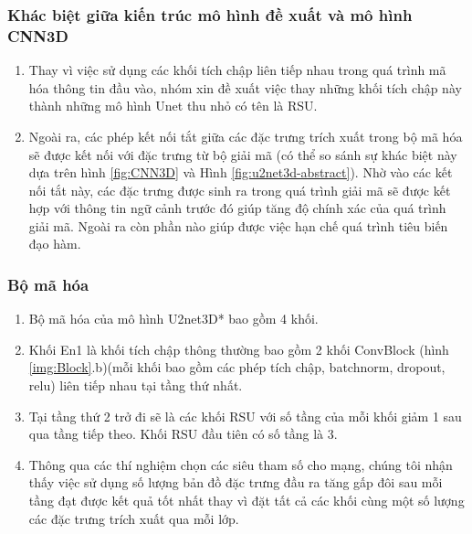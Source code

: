 \newpage
\subsubsection{Khác biệt giữa kiến trúc mô hình đề xuất và mô hình CNN3D\cite{LV_LIVER}}
\begin{enumerate}
    \item Thay vì việc sử dụng các khối tích chập liên tiếp nhau trong quá trình mã hóa thông tin đầu vào, nhóm xin đề xuất việc thay những khối tích chập này thành những mô hình Unet thu nhỏ có tên là RSU.
    \item Ngoài ra, các phép kết nối tắt giữa các đặc trưng trích xuất trong bộ mã hóa sẽ được kết nối với đặc trưng từ bộ giải mã (có thể so sánh sự khác biệt này dựa trên hình \ref{fig:CNN3D} và Hình \ref{fig:u2net3d-abstract}). Nhờ vào các kết nối tắt này, các đặc trưng được sinh ra trong quá trình giải mã sẽ được kết hợp với thông tin ngữ cảnh trước đó giúp tăng độ chính xác của quá trình giải mã. Ngoài ra còn phần nào giúp được việc hạn chế quá trình tiêu biến đạo hàm.
\end{enumerate}
\vspace{-1cm}
\subsubsection{Bộ mã hóa}
\begin{enumerate}
    \item[] Bộ mã hóa của mô hình U2net3D* bao gồm 4 khối. 
    \item Khối En1 là khối tích chập thông thường bao gồm 2 khối ConvBlock (hình \ref{img:Block}.b)(mỗi khối bao gồm các phép tích chập, batchnorm, dropout, relu) liên tiếp nhau tại tầng thứ nhất. 
    \item Tại tầng thứ 2 trở đi sẽ là các khối RSU với số tầng của mỗi khối giảm 1 sau qua tầng tiếp theo. Khối RSU đầu tiên có số tầng là 3.  
    \item Thông qua các thí nghiệm chọn các siêu tham số cho mạng, chúng tôi nhận thấy việc sử dụng số lượng bản đồ đặc trưng đầu ra tăng gấp đôi sau mỗi tầng đạt được kết quả tốt nhất thay vì đặt tất cả các khối cùng một số lượng các đặc trưng trích xuất qua mỗi lớp.
\end{enumerate} 
\vspace{-1cm}

